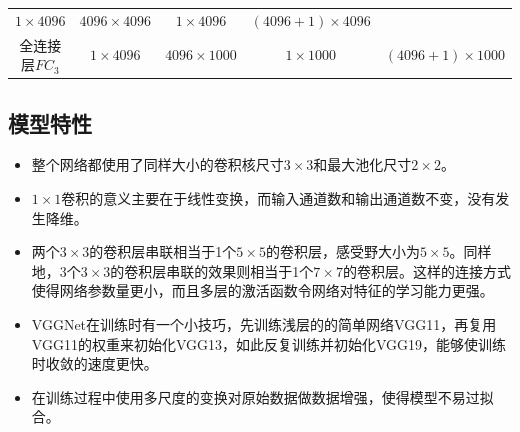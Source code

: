 \documentclass[12pt,a4paper,UTF8,twoside]{book}
\providecommand{\tightlist}{%
  \setlength{\itemsep}{0pt}\setlength{\parskip}{0pt}}
\begin{document}
\begin{longtable}[]{@{}ccccc@{}}
\begin{minipage}[t]{0.17\columnwidth}
\(1\times4096\)\strut
\end{minipage} & \begin{minipage}[t]{0.17\columnwidth}\centering
\(4096\times4096\)\strut
\end{minipage} & \begin{minipage}[t]{0.17\columnwidth}\centering
\(1\times4096\)\strut
\end{minipage} & \begin{minipage}[t]{0.17\columnwidth}\centering
\((4096+1)\times4096\)\strut
\end{minipage}\tabularnewline
\begin{minipage}[t]{0.17\columnwidth}\centering
全连接层\(FC_{3}\)\strut
\end{minipage} & \begin{minipage}[t]{0.17\columnwidth}\centering
\(1\times4096\)\strut
\end{minipage} & \begin{minipage}[t]{0.17\columnwidth}\centering
\(4096\times1000\)\strut
\end{minipage} & \begin{minipage}[t]{0.17\columnwidth}\centering
\(1\times1000\)\strut
\end{minipage} & \begin{minipage}[t]{0.17\columnwidth}\centering
\((4096+1)\times1000\)\strut
\end{minipage}\tabularnewline
\bottomrule
\end{longtable}

\hypertarget{ux6a21ux578bux7279ux6027-3}{%
\subsection{模型特性}\label{ux6a21ux578bux7279ux6027-3}}

\begin{itemize}
\tightlist
\item
  整个网络都使用了同样大小的卷积核尺寸\(3\times3\)和最大池化尺寸\(2\times2\)。
\item
  \(1\times1\)卷积的意义主要在于线性变换，而输入通道数和输出通道数不变，没有发生降维。
\item
  两个\(3\times3\)的卷积层串联相当于1个\(5\times5\)的卷积层，感受野大小为\(5\times5\)。同样地，3个\(3\times3\)的卷积层串联的效果则相当于1个\(7\times7\)的卷积层。这样的连接方式使得网络参数量更小，而且多层的激活函数令网络对特征的学习能力更强。
\item
  VGGNet在训练时有一个小技巧，先训练浅层的的简单网络VGG11，再复用VGG11的权重来初始化VGG13，如此反复训练并初始化VGG19，能够使训练时收敛的速度更快。
\item
  在训练过程中使用多尺度的变换对原始数据做数据增强，使得模型不易过拟合。
\end{itemize}
\end{document}
